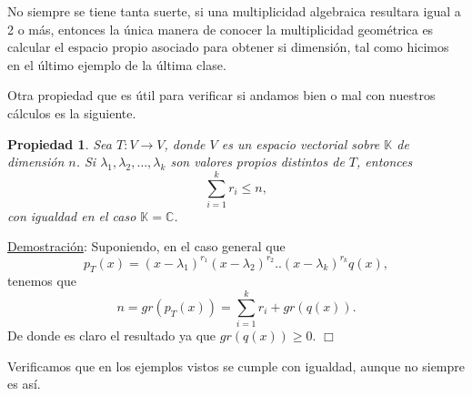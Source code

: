 \documentclass[12pt]{book}
\newtheorem{prop}{Propiedad}
\def\C{\mathbb{C}}
\def\K{\mathbb{K}}
\begin{document}
No siempre se tiene tanta suerte, si una multiplicidad algebraica resultara igual a 2 o más, entonces la única manera de conocer la multiplicidad geométrica es calcular el espacio propio asociado para obtener si dimensión, tal como hicimos en el último ejemplo de la última clase.

Otra propiedad que es útil para verificar si andamos bien o mal con nuestros cálculos es la siguiente.

\begin{prop}\label{teo:grp}
Sea $T:V\rightarrow V$, donde $V$ es un espacio vectorial sobre $\K$ de dimensión $n$. 
Si $\lambda_1,\lambda_2,\dots,\lambda_k$ son valores propios distintos de $T$, entonces 
$$\sum_{i=1}^k r_i \le n,$$
con igualdad en el caso $\K=\C$.
\end{prop}
\underline{Demostración}: {\small
Suponiendo, en el caso general que
$$p_T(x)=(x-\lambda_1)^{r_1}(x-\lambda_2)^{r_2}..(x-\lambda_k)^{r_k}q(x),$$
tenemos que 
$$n=gr(p_T(x))=\sum_{i=1}^k r_i+gr(q(x)).$$
De donde es claro el resultado ya que $gr(q(x))\ge 0$.
 \hfill $\Box$
}

Verificamos que en los ejemplos vistos se cumple con igualdad, aunque no siempre es así.
\end{document}
